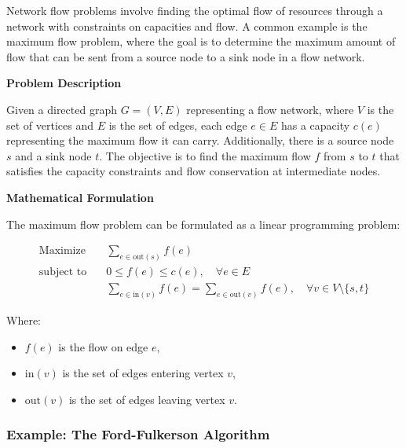 \documentclass[12pt]{book} %
\begin{document}
Network flow problems involve finding the optimal flow of resources through a network with constraints on capacities and flow. A common example is the maximum flow problem, where the goal is to determine the maximum amount of flow that can be sent from a source node to a sink node in a flow network.

\textbf{Problem Description}

Given a directed graph \(G = (V, E)\) representing a flow network, where \(V\) is the set of vertices and \(E\) is the set of edges, each edge \(e \in E\) has a capacity \(c(e)\) representing the maximum flow it can carry. Additionally, there is a source node \(s\) and a sink node \(t\). The objective is to find the maximum flow \(f\) from \(s\) to \(t\) that satisfies the capacity constraints and flow conservation at intermediate nodes.

\textbf{Mathematical Formulation}

The maximum flow problem can be formulated as a linear programming problem:

\[
\begin{aligned}
\text{Maximize} \quad & \sum_{e \in \text{out}(s)} f(e) \\
\text{subject to} \quad & 0 \leq f(e) \leq c(e), \quad \forall e \in E \\
& \sum_{e \in \text{in}(v)} f(e) = \sum_{e \in \text{out}(v)} f(e), \quad \forall v \in V \setminus \{s, t\}
\end{aligned}
\]

Where:
\begin{itemize}
    \item \(f(e)\) is the flow on edge \(e\),
    \item \(\text{in}(v)\) is the set of edges entering vertex \(v\),
    \item \(\text{out}(v)\) is the set of edges leaving vertex \(v\).
\end{itemize}


\subsubsection{Example: The Ford-Fulkerson Algorithm}
\end{document}
